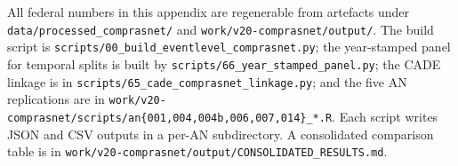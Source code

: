 All federal numbers in this appendix are regenerable from
artefacts under \texttt{data/processed\_comprasnet/} and
\texttt{work/v20-comprasnet/output/}. The build script is
\texttt{scripts/00\_build\_eventlevel\_comprasnet.py}; the
year-stamped panel for temporal splits is built by
\texttt{scripts/66\_year\_stamped\_panel.py}; the CADE linkage is
in \texttt{scripts/65\_cade\_comprasnet\_linkage.py}; and the
five AN replications are in
\texttt{work/v20-comprasnet/scripts/an\{001,004,004b,006,007,014\}\_*.R}.
Each script writes JSON and CSV outputs in a per-AN subdirectory.
A consolidated comparison table is in
\texttt{work/v20-comprasnet/output/CONSOLIDATED\_RESULTS.md}.
